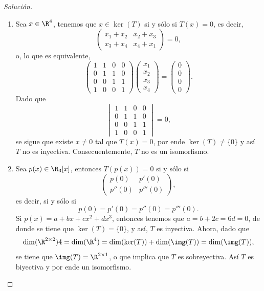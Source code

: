 \documentclass[a4,11pt]{aleph-notas}
\begin{document}
\begin{proof}[Solución]\hspace{0pt}
    \begin{enumerate}
        \item Sea $x\in\R^4$, tenemos que $x\in\ker(T)$ si y sólo si $T(x)=0$, es decir,
        \[
            \begin{pmatrix}
            x_1 + x_2 & x_2 + x_3\\
            x_3 + x_4 & x_4 + x_1
            \end{pmatrix} = 0,
        \]
        o, lo que es equivalente,
        \[
            \begin{pmatrix}
            1 & 1 & 0 & 0\\
            0 & 1 & 1 & 0\\
            0 & 0 & 1 & 1\\
            1 & 0 & 0 & 1 
            \end{pmatrix} \begin{pmatrix}
            x_1 \\ x_2 \\ x_3 \\ x_4
            \end{pmatrix} = \begin{pmatrix}
            0 \\ 0 \\ 0 \\ 0
            \end{pmatrix}.
        \]
        Dado que
        \[
            \begin{vmatrix}
            1 & 1 & 0 & 0\\
            0 & 1 & 1 & 0\\
            0 & 0 & 1 & 1\\
            1 & 0 & 0 & 1 
            \end{vmatrix} = 0,
        \]
        se sigue que existe $x\neq 0$ tal que $T(x) = 0$, por ende $\ker(T)\neq \{0\}$ y así $T$ no es inyectiva. Consecuentemente, $T$ no es un isomorfismo.
        
        \item Sea $p(x)\in\R_3[x]$, entonces $T(p(x))= 0$ si y sólo si
        \[
            \begin{pmatrix}
        p(0) & p'(0) \\
        p''(0) & p'''(0)
        \end{pmatrix},
        \]
        es decir, si y sólo si 
        \[
            p(0) = p'(0) = p''(0) = p'''(0).
        \]
        Si $p(x) = a + bx + cx^2 + dx^3$, entonces tenemos que $a = b + 2c = 6d = 0$, de donde se tiene que $\ker(T)=\{0\}$, y así, $T$ es inyectiva. Ahora, dado que
        \[
           \dim(\R^{2\times 2}) 4 = \dim(\R^4) = \dim(\ker(T)) + \dim(\img(T)) = \dim(\img(T)),
        \]
        se tiene que $\img(T)=\R^{2\times 1}$, o que implica que $T$ es sobreyectiva. Así $T$ es biyectiva y por ende un isomorfismo.
        

\end{enumerate}
\end{proof}
\end{document}
